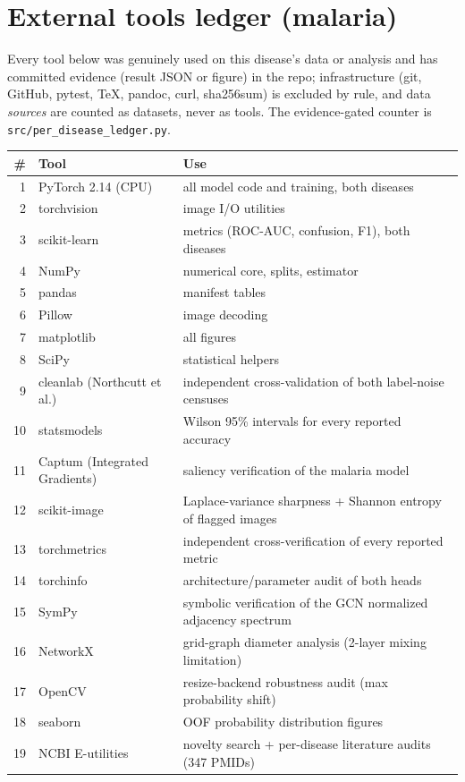 
\section{External tools ledger (malaria)}
Every tool below was genuinely used on this disease's data or analysis and
has committed evidence (result JSON or figure) in the repo; infrastructure
(git, GitHub, pytest, \TeX, pandoc, curl, sha256sum) is excluded by rule,
and data \emph{sources} are counted as datasets, never as tools. The
evidence-gated counter is \texttt{src/per\_disease\_ledger.py}.
\begin{longtable}{r p{4.6cm} p{8.2cm}}
\hline \# & Tool & Use \\ \hline \endhead
1 & PyTorch 2.14 (CPU) & all model code and training, both diseases \\
2 & torchvision & image I/O utilities \\
3 & scikit-learn & metrics (ROC-AUC, confusion, F1), both diseases \\
4 & NumPy & numerical core, splits, estimator \\
5 & pandas & manifest tables \\
6 & Pillow & image decoding \\
7 & matplotlib & all figures \\
8 & SciPy & statistical helpers \\
9 & cleanlab (Northcutt et al.) & independent cross-validation of both label-noise censuses \\
10 & statsmodels & Wilson 95\% intervals for every reported accuracy \\
11 & Captum (Integrated Gradients) & saliency verification of the malaria model \\
12 & scikit-image & Laplace-variance sharpness + Shannon entropy of flagged images \\
13 & torchmetrics & independent cross-verification of every reported metric \\
14 & torchinfo & architecture/parameter audit of both heads \\
15 & SymPy & symbolic verification of the GCN normalized adjacency spectrum \\
16 & NetworkX & grid-graph diameter analysis (2-layer mixing limitation) \\
17 & OpenCV & resize-backend robustness audit (max probability shift) \\
18 & seaborn & OOF probability distribution figures \\
19 & NCBI E-utilities & novelty search + per-disease literature audits (347 PMIDs) \\

\end{longtable}
